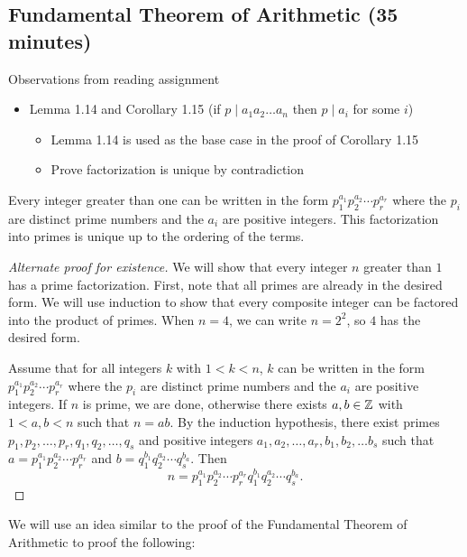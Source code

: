 \documentclass{ximera}
\begin{document}
\subsection{Fundamental Theorem of Arithmetic (35 minutes)}

Observations from reading assignment
\begin{itemize}
 \item Lemma 1.14 and Corollary 1.15 (if $p\mid a_1a_2\dots a_n$ then $p\mid a_i$ for some $i$)
\begin{itemize}
\item Lemma 1.14 is used as the base case in the proof of Corollary 1.15
 \item Prove factorization is unique by contradiction
\end{itemize}
\end{itemize}

\begin{thm*}
	Every integer greater than one can be written in the form $p_1^{a_1}p_2^{a_2}\cdots p_r^{a_r}$ where the $p_i$ are distinct prime numbers and the $a_i$ are positive integers. This factorization into primes is unique up to the ordering of the terms.
\end{thm*}
\begin{proof}[Alternate proof for existence]
 We will show that every integer $n$ greater than $1$ has a prime factorization. First, note that all primes are already in the desired form. We will use induction to show that every composite integer can be factored into the product of primes. When $n=4$, we can write $n=2^2$, so $4$ has the desired form.
 
Assume that for all integers $k$ with $1<k<n$, $k$ can be written in the form  $p_1^{a_1}p_2^{a_2}\cdots p_r^{a_r}$ where the $p_i$ are distinct prime numbers and the $a_i$ are positive integers. If $n$ is prime, we are done, otherwise there exists $a,b\in\mathbb Z$ with $1<a,b<n$ such that $n=ab$. By the induction hypothesis, there exist primes $p_1,p_2,\dots,p_r,q_1,q_2,\dots,q_s$ and positive integers $a_1,a_2,\dots,a_r,b_1,b_2,\dots b_s$ such that $a=p_1^{a_1}p_2^{a_2}\cdots p_r^{a_r}$ and $b=q_1^{b_1}q_2^{a_2}\cdots q_s^{b_a}$. Then \[n=p_1^{a_1}p_2^{a_2}\cdots p_r^{a_r}q_1^{b_1}q_2^{a_2}\cdots q_s^{b_a}.\]
\end{proof}

We will use an idea similar to the proof of the Fundamental Theorem of Arithmetic to proof the following:
\end{document}
